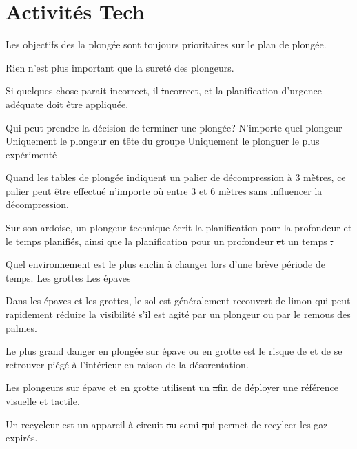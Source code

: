 \documentclass[english,10pt,a4paper]{article}
\begin{document}
	\section{Activités Tech}

	\begin{outline}
		\1 Les objectifs des la plongée sont toujours prioritaires sur le plan de plongée. \vf

		\1 Rien n'est plus important que la sureté des plongeurs. \vf

		\1 Si quelques chose parait incorrect, il \st incorrect, et la planification d'urgence adéquate doit être appliquée. \vf

		\1 Qui peut prendre la décision de terminer une plongée?
			\2 N'importe quel plongeur
			\2 Uniquement le plongeur en tête du groupe
			\2 Uniquement le plonguer le plus expérimenté

		\1 Quand les tables de plongée indiquent un palier de décompression à 3 mètres, ce palier peut être effectué n'importe où entre 3 et 6 mètres sans influencer la décompression. \vf

		\1 Sur son ardoise, un plongeur technique écrit la planification pour la profondeur et le temps planifiés, ainsi que la planification pour un profondeur \st et un temps \st.
		\vspace{1cm}

		\1 Quel environnement est le plus enclin à changer lors d'une brève période de temps.
			\2 Les grottes
			\2 Les épaves

		\1 Dans les épaves et les grottes, le sol est généralement recouvert de limon qui peut rapidement réduire la visibilité s'il est agité par un plongeur ou par le remous des palmes. \vf

		\1 Le plus grand danger en plongée sur épave ou en grotte est le risque de \st et de se retrouver piégé à l'intérieur en raison de la désorentation.
		\vspace{1cm}

		\1 Les plongeurs sur épave et en grotte utilisent un \st afin de déployer une référence visuelle et tactile.
		\vspace{1cm}

		\1 Un recycleur est un appareil à circuit \st ou semi-\st qui permet de recylcer les gaz expirés.
		\vspace{1cm}


\end{outline}
\end{document}

